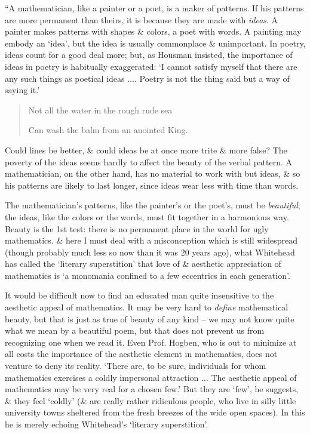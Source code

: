 \documentclass{article}
\numberwithin{equation}{section}
\begin{document}
 ``A mathematician, like a painter or a poet, is a maker of patterns. If his patterns are more permanent than theirs, it is because they are made with \textit{ideas}. A painter makes patterns with shapes \& colors, a poet with words. A painting may embody an `idea', but the idea is usually commonplace \& unimportant. In poetry, ideas count for a good deal more; but, as Housman insisted, the importance of ideas in poetry is habitually exaggerated: `I cannot satisfy myself that there are any such things as poetical ideas $\ldots$. Poetry is not the thing said but a way of saying it.'
\begin{quotation}
	Not all the water in the rough rude sea
	
	Can wash the balm from an anointed King.
\end{quotation}
Could lines be better, \& could ideas be at once more trite \& more false? The poverty of the ideas seems hardly to affect the beauty of the verbal pattern. A mathematician, on the other hand, has no material to work with but ideas, \& so his patterns are likely to last longer, since ideas wear less with time than words.

The mathematician's patterns, like the painter's or the poet's, must be \textit{beautiful}; the ideas, like the colors or the words, must fit together in a harmonious way. Beauty is the 1st test: there is no permanent place in the world for ugly mathematics. \& here I must deal with a misconception which is still widespread (though probably much less so now than it was 20 years ago), what Whitehead has called the `literary superstition' that love of \& aesthetic appreciation of mathematics is `a monomania confined to a few eccentrics in each generation'.

It would be difficult now to find an educated man quite insensitive to the aesthetic appeal of mathematics. It may be very hard to \textit{define} mathematical beauty, but that is just as true of beauty of any kind -- we may not know quite what we mean by a beautiful poem, but that does not prevent us from recognizing one when we read it. Even Prof. Hogben, who is out to minimize at all costs the importance of the aesthetic element in mathematics, does not venture to deny its reality. `There are, to be sure, individuals for whom mathematics exercises a coldly impersonal attraction $\ldots$ The aesthetic appeal of mathematics may be very real for a chosen few.' But they are `few', he suggests, \& they feel `coldly' (\& are really rather ridiculous people, who live in silly little university towns sheltered from the fresh breezes of the wide open spaces). In this he is merely echoing Whitehead's `literary superstition'.
\end{document}
